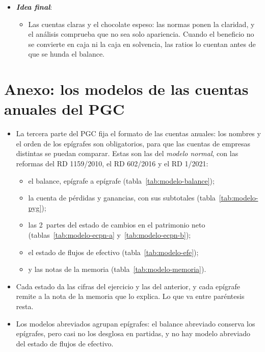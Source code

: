 \documentclass[11pt]{article}
\begin{document}
\begin{itemize}
\begin{itemize}
  \item Lo advirtió  (1981): «si torturas los datos lo suficiente, la naturaleza siempre confesará»;\footnote{En el original: «if you torture the data enough, nature will always confess».  la citó en su conferencia \emph{How Should Economists Choose?} (18~de noviembre de 1981, publicada en 1982) como un dicho suyo de principios de los años sesenta; circula también sin «la naturaleza»\nocite{Coase1982How}.} unas cuentas forzadas dicen lo que quiere oír quien las presenta.
  \end{itemize}
\item \textbf{\emph{Idea final}}:
  \begin{itemize}
  \item Las cuentas claras y el chocolate espeso: las normas ponen la claridad, y el análisis comprueba que no sea solo apariencia. Cuando el beneficio no se convierte en caja ni la caja en solvencia, las ratios lo cuentan antes de que se hunda el balance.
  \end{itemize}
\end{itemize}

\clearpage
\appendix

\section{Anexo: los modelos de las cuentas anuales del PGC}\label{anexo:modelos}

\begin{itemize}
\item La tercera parte del PGC fija el formato de las cuentas anuales: los nombres y el orden de los epígrafes son obligatorios, para que las cuentas de empresas distintas se puedan comparar. Estas son las del \emph{modelo normal}, con las reformas del RD 1159/2010, el RD 602/2016 y el RD 1/2021\nocite{BOE2007PGC,BOE2010NOFCAC,BOE2016RD602,BOE2021RD1}:
  \begin{itemize}
  \item el balance, epígrafe a epígrafe (tabla~\ref{tab:modelo-balance});
  \item la cuenta de pérdidas y ganancias, con sus subtotales (tabla~\ref{tab:modelo-pyg});
  \item las 2~partes del estado de cambios en el patrimonio neto (tablas~\ref{tab:modelo-ecpn-a} y~\ref{tab:modelo-ecpn-b});
  \item el estado de flujos de efectivo (tabla~\ref{tab:modelo-efe});
  \item y las notas de la memoria (tabla~\ref{tab:modelo-memoria}).
  \end{itemize}
\item Cada estado da las cifras del ejercicio y las del anterior, y cada epígrafe remite a la nota de la memoria que lo explica. Lo que va entre paréntesis resta.
\item Los modelos abreviados agrupan epígrafes: el balance abreviado conserva los epígrafes, pero casi no los desglosa en partidas, y no hay modelo abreviado del estado de flujos de efectivo.
\end{itemize}
\end{document}
